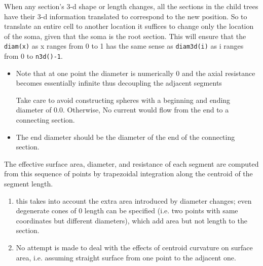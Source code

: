 When any section's 3-d shape or length changes, all the sections in the child
trees have their 3-d information translated to correspond to the new position.
So to translate an entire cell to another location it suffices to change only
the location of the soma, given that the soma is the root section.
This will ensure that the \verb!diam(x)! as x ranges from 0 to 1 has the same
sense as \verb!diam3d(i)! as i ranges from 0 to \verb!n3d()-1!.
\begin{itemize}
  \item  Note that at one point the diameter is numerically 0 and the axial
  resistance becomes essentially infinite thus decoupling the adjacent segments
  
Take care to avoid constructing spheres with a beginning and ending diameter
of 0.0. Otherwise, No current would flow from the end to a connecting section.

  \item The end diameter should be the diameter of the end of the connecting
  section.
\end{itemize}

The effective surface area, diameter, and resistance of each segment are
computed from this sequence of points by trapezoidal integration along the
centroid of the segment length.
\begin{enumerate}
  
  \item  this takes into account the extra area introduced by diameter changes;
  even degenerate cones of 0 length can be specified 
  (i.e. two points with same coordinates but different diameters), which add
  area but not length to the section. 
  
  \item No attempt is made to deal with the effects of centroid curvature on
  surface area, i.e. assuming straight surface from one point to the adjacent
  one.
  
\end{enumerate}

